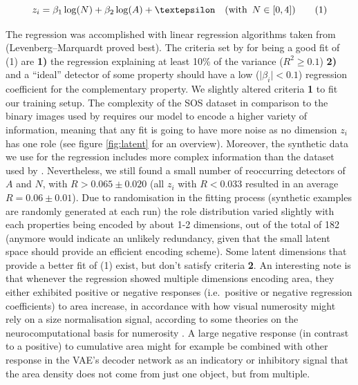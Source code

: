 \documentclass[twocolumn]{article}
\begin{document}
{\[z_i = \beta_1 \log(N) + \beta_2\log(A) + \textrm{\textepsilon} \quad (\textrm{with }\, N \in [0, 4]) \tag{1} \]

The regression was accomplished with linear regression algorithms taken
from \citet{newville2016lmfit} (Levenberg--Marquardt proved best). The
criteria set by \citet{stoianov2012} for being a good fit of (1)
are \textbf{1)} the regression explaining at least 10\% of the variance
(\(R^2 \geq 0.1\)) \textbf{2)} and a ``ideal'' detector of some
property should have a low (\(\mid\beta_i\mid < 0.1\)) regression
coefficient for the complementary property. We slightly altered criteria
\textbf{1} to fit our training setup. The complexity of the SOS
dataset in comparison to the binary images used by \citet{stoianov2012}
requires our model to encode a higher variety of information, meaning
that any fit is going to have more noise as no dimension \(z_i\) has one
role (see figure \ref{fig:latent} for an overview). Moreover, the synthetic data we
use for the regression includes more complex information than the
dataset used by \citet{stoianov2012}. Nevertheless, we still found a
small number of reoccurring detectors of \(A\) and \(N\), with
\(R > 0.065 \pm 0.020\) (all \(z_i\) with \(R < 0.033\) resulted in an
average \(R= 0.06 \pm 0.01\)). Due to randomisation in the fitting
process (synthetic examples are randomly generated at each run) the role
distribution varied slightly with each properties being encoded by about
1-2 dimensions, out of the total of 182 (anymore would indicate an
unlikely redundancy, given that the small latent space should provide an
efficient encoding scheme). Some latent dimensions that provide a better
fit of (1) exist, but don't satisfy criteria \textbf{2}. An
interesting note is that whenever the regression showed multiple
dimensions encoding area, they either exhibited positive or negative
responses (i.e.~positive or negative regression coefficients) to area
increase, in accordance with how visual numerosity might rely on a size
normalisation signal, according to some theories on the
neurocomputational basis for numerosity \citep[see][ for a
discussion]{stoianov2012}. A large negative response (in contrast to a
positive) to cumulative area might for example be combined with other
response in the VAE's decoder network as an indicatory or inhibitory
signal that the area density does not come from just one object, but
from multiple.

}
\end{document}
